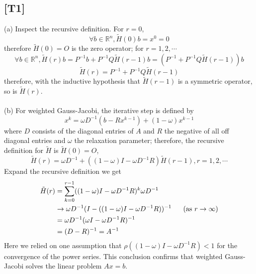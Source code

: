 \documentclass[12pt,a4paper]{article}
\newcommand{\ra}[1]{\ifnum #1=1\rightarrow\fi\ifnum #1=2\Rightarrow\fi}
\newcommand{\bga}{\begin{align*}}
\newcommand{\SUM}[2]{\sum\limits_{#1}^{#2}}
\newcommand{\R}{\mathbb R}%
\begin{document}
\subsection*{[T1]} 
(a) Inspect the recursive definition. For $r = 0$, 
$$\forall b\in \R^n, \tilde H(0)b = x^0 = 0$$
therefore $\tilde H(0) = O$ is the zero operator; for $r = 1,2, \cdots $
$$\forall b\in\R^n, \tilde H(r)b = P^{-1}b + P^{-1}Q\tilde H(r-1)b = (P^{-1} + P^{-1}Q\tilde H(r-1))b$$
$$\tilde H(r) = P^{-1} + P^{-1}Q \tilde H(r-1)$$
therefore, with the inductive hypothesis that $\tilde H(r-1)$ is a symmetric operator, so is $\tilde H(r)$.\\
\\
(b) For weighted Gauss-Jacobi, the iterative step is defined by
$$x^{k} = \omega D^{-1}(b - Rx^{k-1}) + (1-\omega)x^{k-1}$$
where $D$ consists of the diagonal entries of $A$ and $R$ the negative of all off diagonal entries and $\omega$ the relaxation parameter; therefore, the recursive definition for $\tilde H$ is $\tilde H(0) = O$, 
$$\tilde H(r) = \omega D^{-1} + ((1-\omega)I -  \omega D^{-1} R)\tilde H(r-1), r =  1,2, \cdots$$
Expand the recursive definition we get
\bga
\tilde H(r)
& = \SUM{k=0}{r-1} ((1-\omega)I -  \omega D^{-1} R)^k \omega D^{-1}  \\
& \ra1 \omega D^{-1} (I-((1-\omega)I -  \omega D^{-1} R))^{-1} \;\;\;\;\;\;(\text{as } r\ra1 \infty)\\
& = \omega D^{-1} (\omega I - \omega D^{-1}R)^{-1} \\
& = (D-R)^{-1} = A^{-1}
\end{align*}
Here we relied on one assumption that $\rho((1-\omega)I -  \omega D^{-1} R) < 1$ for the convergence of the power series. This conclusion confirms that weighted Gauss-Jacobi solves the linear problem $Ax = b$. 
\end{document}
